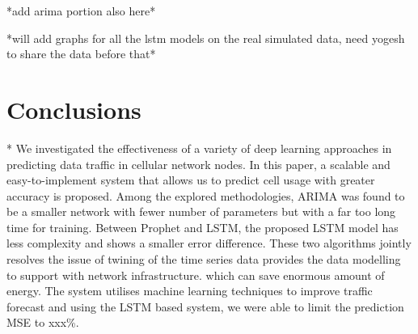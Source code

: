 \documentclass[conference]{IEEEtran}
\begin{document}
\begin{table}[ht]
  \caption{Performance of Different Models on Various Synthetic Datasets}
  \centering
\end{table}
*add arima portion also here*

*will add graphs for all the lstm models on the real simulated data, need yogesh to share the data before that*

\section{Conclusions}
*
We investigated the effectiveness of a variety of deep learning approaches in predicting data traffic in cellular network nodes. In this paper, a scalable and easy-to-implement system that allows us to predict cell usage with greater accuracy is proposed. Among the explored methodologies, ARIMA was found to be a smaller network with fewer number of parameters but with a far too long time for training. Between Prophet and LSTM, the proposed LSTM model has less complexity and shows a smaller error difference. These two algorithms jointly resolves the issue of twining of the time series data provides the data modelling to support with network infrastructure. which can save enormous amount of energy. The system utilises machine learning techniques to improve traffic forecast and using the LSTM based system, we were able to limit the prediction MSE to xxx\%.
\end{document}
